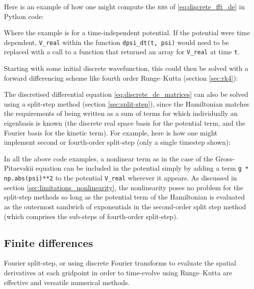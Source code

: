 Here is an example of how one might compute the \textsc{rhs} of \eqref{eq:discrete_fft_de} in Python code:


Where the example is for a time-independent potential. If the potential were time dependent, \texttt{V\_real} within the function \texttt{dpsi\_dt(t, psi)} would need to be replaced with a call to a function that returned an array for \texttt{V\_real} at time \texttt{t}.

Starting with some initial discrete wavefunction, this could then be solved with a forward differencing scheme like fourth order Runge--Kutta (section \ref{sec:rk4}):


The discretised differential equation \eqref{eq:discrete_de_matrices} can also be solved using a split-step method (section \ref{sec:split-step}), since the Hamiltonian matches the requirements of being written as a sum of terms for which individually an eigenbasis is known (the discrete real space basis for the potential term, and the Fourier basis for the kinetic term). For example, here is how one might implement second or fourth-order split-step (only a single timestep shown):


In all the above code examples, a nonlinear term as in the case of the Gross-Pitaevskii equation can be included in the potential simply by adding a term \texttt{g * np.abs(psi)**2} to the potential \texttt{V\_real} wherever it appears. As discussed in section \ref{sec:limitations_nonlinearity}, the nonlinearity poses no problem for the split-step methods so long as the potential term of the Hamiltonian is evaluated as the outermost sandwich of exponentials in the second-order split step method (which comprises the sub-steps of fourth-order split-step).

\subsection{Finite differences}
Fourier split-step, or using discrete Fourier transforms to evaluate the spatial derivatives at each gridpoint in order to time-evolve using Runge--Kutta are effective and versatile numerical methods.

